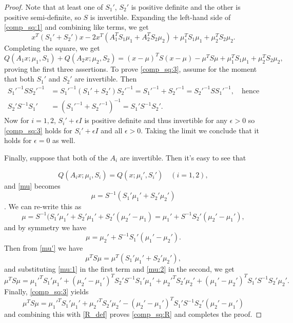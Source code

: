 \documentclass[12pt,leqno]{article}
\begin{document}
\begin{proof}
  Note that at least one of $S_1'$, $S_2'$ is positive definite and the other is positive semi-definite,
so $S$ is invertible.  Expanding the left-hand side of \eqref{comp_sq:1} and combining
like terms, we get
$$
x^T(S_1'+ S_2')x -2x^T(A_1^TS_1\mu_1+ A_2^TS_2\mu_2) 
+ \mu_1^TS_1\mu_1 + \mu_2^TS_2\mu_2.
$$
Completing the square, we get
$$
Q(A_1x;\mu_1,S_1) + Q(A_2x;\mu_2,S_2) = (x-\mu)^TS(x-\mu) -\mu^TS\mu + \mu_1^TS_1\mu_1 + \mu_2^TS_2\mu_2,
$$
proving the first three assertions.
To prove \eqref{comp_sq:3}, assume for the moment that both $S_1'$ and $S_2'$ are invertible.
Then
\begin{align*}
S_1'^{-1}SS_2'^{-1} &= S_1'^{-1}(S_1'+S_2')S_2'^{-1} = S_1'^{-1}+S_2'^{-1} = S_2'^{-1}SS_1'^{-1},\quad\text{hence}\\
S_2'S^{-1}S_1' &= (S_1'^{-1}+S_2'^{-1})^{-1} = S_1'S^{-1}S_2'.
\end{align*}
Now for $i = 1,2$, $S_i'+\epsilon{I}$ is positive definite and thus invertible for any $\epsilon > 0$
so \eqref{comp_sq:3} holds for $S_i'+\epsilon{I}$ and all $\epsilon > 0$.  Taking the limit
we conclude that it holds for $\epsilon = 0$ as well.

Finally, suppose that both of the $A_i$ are invertible. Then it's easy to see that

\begin{equation}\label{comp_sq:4}
Q(A_ix;\mu_i,S_i) = Q(x;\mu_i',S_i')\quad(i = 1,2),
\end{equation}
and \eqref{mu} becomes
\begin{equation} \label{mu'}
\mu = S^{-1}(S_1'\mu_1' + S_2'\mu_2')
\end{equation}.
We can re-write this as
\begin{equation}\label{mu:1}
\mu = S^{-1}(S_1'\mu_1' + S_2'\mu_1' + S_2'(\mu_2'-\mu_1) = \mu_1' + S^{-1}S_2'(\mu_2'-\mu_1'),
\end{equation}
and by symmetry we have
\begin{equation}\label{mu:2}
  \mu = \mu_2' + S^{-1}S_1'(\mu_1'-\mu_2').
\end{equation}
Then from \eqref{mu'} we have
$$
\mu^TS\mu = \mu^T(S_1'\mu_1' + S_2'\mu_2'),
$$
and substituting \eqref{mu:1} in the first term and \eqref{mu:2} in the second, we get
$$
\mu^TS\mu = \mu_1'^TS_1'\mu_1' + (\mu_2'-\mu_1')^TS_2'S^{-1}S_1'\mu_1' + \mu_2'^TS_2'\mu_2'+(\mu_1'-\mu_2')^TS_1'S^{-1}S_2'\mu_2'.
$$
Finally, \eqref{comp_sq:3} yields
$$
\mu^TS\mu = \mu_1'^TS_1'\mu_1' + \mu_2'^TS_2'\mu_2' - (\mu_2'-\mu_1')^TS_1'S^{-1}S_2'(\mu_2'-\mu_1')
$$
and combining this with \eqref{R_def} proves \eqref{comp_sq:R} and completes the proof.
\end{proof}
\end{document}
